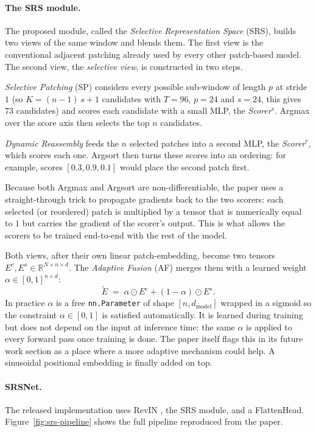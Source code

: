 \documentclass[10pt]{article}
\begin{document}
\paragraph{The SRS module.}
The proposed module, called the \emph{Selective Representation
Space} (SRS), builds two views of the same window and blends
them. The first view is the conventional adjacent patching
already used by every other patch-based model. The second view,
the \emph{selective view}, is constructed in two steps.

\emph{Selective Patching} (SP) considers every possible sub-window of
length $p$ at stride $1$ (so $K = (n-1)\,s + 1$ candidates with
$T = 96$, $p = 24$ and $s = 24$, this gives $73$ candidates) and
scores each candidate with a small MLP, the \emph{Scorer$^s$}. Argmax
over the score axis then selects the top $n$ candidates.

\emph{Dynamic Reassembly} feeds the $n$ selected patches into a
second MLP, the \emph{Scorer$^r$}, which scores each one. Argsort then
turns these scores into an ordering: for example, scores
$[0.3, 0.9, 0.1]$ would place the second patch first.

Because both Argmax and Argsort are non-differentiable, the paper
uses a straight-through trick to propagate gradients back to the
two scorers: each selected (or reordered) patch is multiplied by
a tensor that is numerically equal to $1$ but carries the gradient
of the scorer's output. This is what allows the scorers to be
trained end-to-end with the rest of the model.

Both views, after their own linear patch-embedding, become two
tensors $E^c, E^s \in \mathbb{R}^{N \times n \times d}$. The
\emph{Adaptive Fusion} (AF) merges them with a learned weight
$\alpha \in [0, 1]^{n \times d}$:
\[
\tilde{E} \;=\; \alpha \odot E^c + (1 - \alpha) \odot E^s.
\]
In practice $\alpha$ is a free \texttt{nn.Parameter} of shape
$[n, d_\text{model}]$ wrapped in a sigmoid so the constraint
$\alpha \in [0, 1]$ is satisfied automatically. It is learned
during training but does not depend on the input at inference
time: the same $\alpha$ is applied to every forward pass once
training is done. The paper itself flags this in its future work section
as a place where a more adaptive mechanism could
help. A sinusoidal positional embedding is finally added on
top.

\paragraph{SRSNet.}
The released implementation uses RevIN \citep{kim2022revin}, the SRS module, and a FlattenHead.
Figure~\ref{fig:srs-pipeline} shows the full
pipeline reproduced from the paper.
\end{document}
